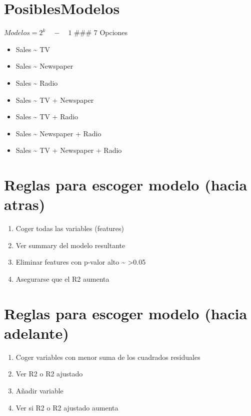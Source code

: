 \documentclass[11pt]{article}
\providecommand{\tightlist}{%
      \setlength{\itemsep}{0pt}\setlength{\parskip}{0pt}}
\begin{document}
    \section{PosiblesModelos}\label{posiblesmodelos}

\(Modelos = { 2 }^{ k }\quad -\quad 1\) \#\#\# 7 Opciones

\begin{itemize}
\tightlist
\item
  Sales \textasciitilde{} TV
\item
  Sales \textasciitilde{} Newspaper
\item
  Sales \textasciitilde{} Radio
\item
  Sales \textasciitilde{} TV + Newspaper
\item
  Sales \textasciitilde{} TV + Radio
\item
  Sales \textasciitilde{} Newspaper + Radio
\item
  Sales \textasciitilde{} TV + Newspaper + Radio
\end{itemize}

    \section{Reglas para escoger modelo (hacia
atras)}\label{reglas-para-escoger-modelo-hacia-atras}

\begin{enumerate}
\def\labelenumi{\arabic{enumi}.}
\tightlist
\item
  Coger todas las variables (features)
\item
  Ver summary del modelo resultante
\item
  Eliminar features con p-valor alto \textasciitilde{}
  \textgreater{}0.05
\item
  Asegurarse que el R2 aumenta
\end{enumerate}

\section{Reglas para escoger modelo (hacia
adelante)}\label{reglas-para-escoger-modelo-hacia-adelante}

\begin{enumerate}
\def\labelenumi{\arabic{enumi}.}
\tightlist
\item
  Coger variables con menor suma de los cuadrados residuales
\item
  Ver R2 o R2 ajustado
\item
  Añadir variable
\item
  Ver si R2 o R2 ajustado aumenta
\end{enumerate}
\end{document}
